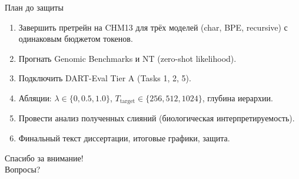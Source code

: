 \documentclass[aspectratio=169,xcolor=table]{beamer}
\begin{document}
\begin{frame}{План до защиты}
  \begin{enumerate}
    \item Завершить претрейн на CHM13 для трёх моделей (char, BPE,
          recursive) с одинаковым бюджетом токенов.
    \item Прогнать Genomic Benchmarks и NT (zero-shot likelihood).
    \item Подключить DART-Eval Tier A (Tasks 1, 2, 5).
    \item Абляции: $\lambda \in \{0, 0.5, 1.0\}$,
          $T_{\text{target}} \in \{256, 512, 1024\}$, глубина иерархии.
    \item Провести анализ полученных слияний (биологическая
          интерпретируемость).
    \item Финальный текст диссертации, итоговые графики, защита.
  \end{enumerate}
\end{frame}

\begin{frame}[standout]
  Спасибо за внимание! \\[0.4em]
  \large Вопросы?
\end{frame}
\end{document}
